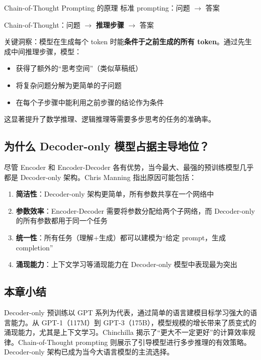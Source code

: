 \begin{importantbox}{Chain-of-Thought Prompting 的原理}
标准 prompting：问题 $\rightarrow$ 答案

Chain-of-Thought：问题 $\rightarrow$ \textbf{推理步骤} $\rightarrow$ 答案

关键洞察：模型在生成每个 token 时能\textbf{条件于之前生成的所有 token}。通过先生成中间推理步骤，模型：
\begin{itemize}
    \item 获得了额外的``思考空间''（类似草稿纸）
    \item 将复杂问题分解为更简单的子问题
    \item 在每个子步骤中能利用之前步骤的结论作为条件
\end{itemize}
这显著提升了数学推理、逻辑推理等需要多步思考的任务的准确率。
\end{importantbox}

\subsection{为什么 Decoder-only 模型占据主导地位？}

尽管 Encoder 和 Encoder-Decoder 各有优势，当今最大、最强的预训练模型几乎都是 Decoder-only 架构。Chris Manning 指出原因可能包括：

\begin{enumerate}
    \item \textbf{简洁性}：Decoder-only 架构更简单，所有参数共享在一个网络中
    \item \textbf{参数效率}：Encoder-Decoder 需要将参数分配给两个子网络，而 Decoder-only 的所有参数都用于同一个任务
    \item \textbf{统一性}：所有任务（理解+生成）都可以建模为``给定 prompt，生成 completion''
    \item \textbf{涌现能力}：上下文学习等涌现能力在 Decoder-only 模型中表现最为突出
\end{enumerate}

\subsection{本章小结}

Decoder-only 预训练以 GPT 系列为代表，通过简单的语言建模目标学习强大的语言能力。从 GPT-1（117M）到 GPT-3（175B），模型规模的增长带来了质变式的涌现能力，尤其是上下文学习。Chinchilla 揭示了``更大不一定更好''的计算效率规律。Chain-of-Thought prompting 则展示了引导模型进行多步推理的有效策略。Decoder-only 架构已成为当今大语言模型的主流选择。


